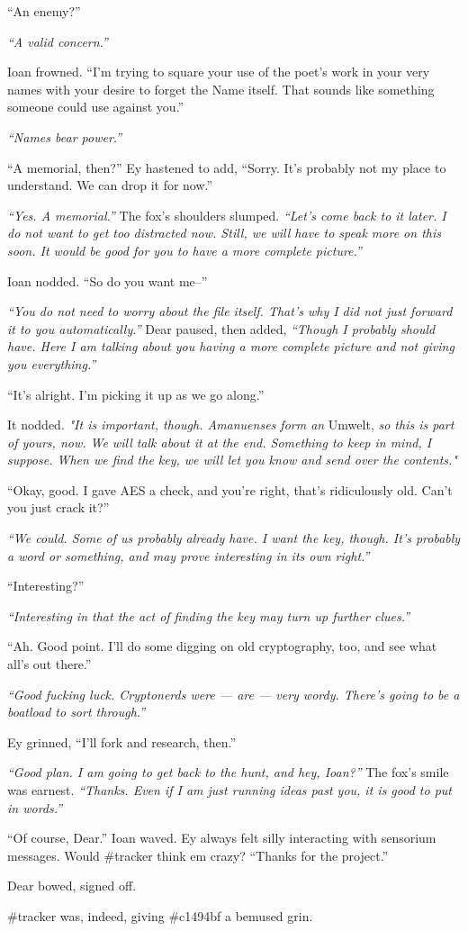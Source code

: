 ``An enemy?''

\emph{``A valid concern.''}

Ioan frowned. ``I'm trying to square your use of the poet's work in your very names with your desire to forget the Name itself. That sounds like something someone could use against you.''

\emph{``Names bear power.''}

``A memorial, then?'' Ey hastened to add, ``Sorry. It's probably not my place to understand. We can drop it for now.''

\emph{``Yes. A memorial.''} The fox's shoulders slumped. \emph{``Let's come back to it later. I do not want to get too distracted now. Still, we will have to speak more on this soon. It would be good for you to have a more complete picture.''}

Ioan nodded. ``So do you want me--''

\emph{``You do not need to worry about the file itself. That's why I did not just forward it to you automatically.''} Dear paused, then added, \emph{``Though I probably should have. Here I am talking about you having a more complete picture and not giving you everything.''}

``It's alright. I'm picking it up as we go along.''

It nodded. \emph{"It is important, though. Amanuenses form an} Umwelt, \emph{so this is part of yours, now. We will talk about it at the end. Something to keep in mind, I suppose. When we find the key, we will let you know and send over the contents."}

``Okay, good. I gave AES a check, and you're right, that's ridiculously old. Can't you just crack it?''

\emph{``We could. Some of us probably already have. I want the key, though. It's probably a word or something, and may prove interesting in its own right.''}

``Interesting?''

\emph{``Interesting in that the act of finding the key may turn up further clues.''}

``Ah. Good point. I'll do some digging on old cryptography, too, and see what all's out there.''

\emph{``Good fucking luck. Cryptonerds were — are — very wordy. There's going to be a boatload to sort through.''}

Ey grinned, ``I'll fork and research, then.''

\emph{``Good plan. I am going to get back to the hunt, and hey, Ioan?''} The fox's smile was earnest. \emph{``Thanks. Even if I am just running ideas past you, it is good to put in words.''}

``Of course, Dear.'' Ioan waved. Ey always felt silly interacting with sensorium messages. Would \#tracker think em crazy? ``Thanks for the project.''

Dear bowed, signed off.

\#tracker was, indeed, giving \#c1494bf a bemused grin.

